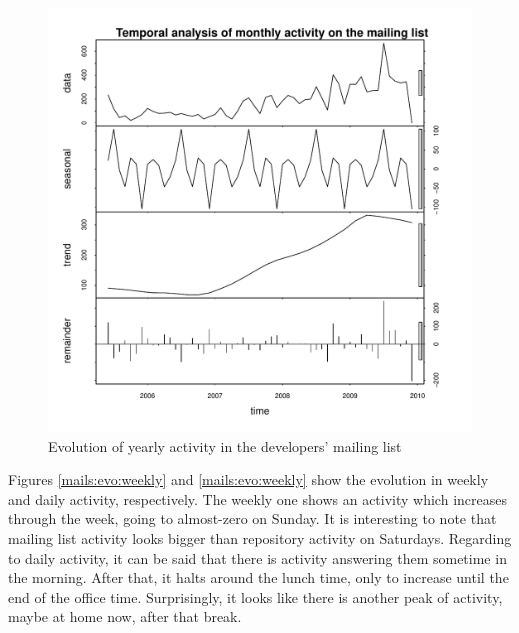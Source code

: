 \begin{figure}[!hptb]
\includegraphics[width=400pt]{images/messagesByMonth.pdf}
\caption{Evolution of yearly activity in the developers' mailing list}
\label{mails:evo:monthly}
\end{figure}

Figures \ref{mails:evo:weekly} and \ref{mails:evo:weekly} show the evolution in weekly and daily activity, respectively. The weekly one shows an activity which increases through the week, going to almost-zero on Sunday. It is interesting to note that mailing list activity looks bigger than repository activity on Saturdays. Regarding to daily activity, it can be said that there is activity answering them sometime in the morning. After that, it halts around the lunch time, only to increase until the end of the office time. Surprisingly, it looks like there is another peak of activity, maybe at home now, after that break.

